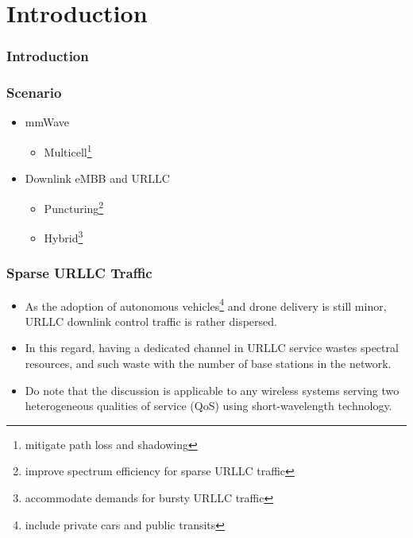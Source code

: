 \section{Introduction}
\begin{frame}
  \frametitle{Introduction}
\end{frame}

\begin{frame}
  \frametitle{Scenario}
  \begin{itemize}
    \item mmWave
      \begin{itemize}
        \item Multicell\footnote{mitigate path loss and shadowing}
      \end{itemize}
    \item Downlink eMBB and URLLC
      \begin{itemize}
        \item Puncturing\footnote{improve spectrum efficiency for sparse URLLC traffic}
        \item Hybrid\footnote{accommodate demands for bursty URLLC traffic}
      \end{itemize}
  \end{itemize}
\end{frame}

\begin{frame}
  \frametitle{Sparse URLLC Traffic}
  \begin{itemize}
    \item As the adoption of autonomous vehicles\footnote{include private cars and public transits} and drone delivery is still minor, URLLC downlink control traffic is rather dispersed.
    \item In this regard, having a dedicated channel in URLLC service wastes spectral resources, and such waste  with the number of base stations in the network.
  \end{itemize}
\end{frame}

\begin{frame}
  \begin{itemize}
    \item Do note that the discussion is applicable to any wireless systems serving two heterogeneous qualities of service (QoS) using short-wavelength technology.
  \end{itemize}
\end{frame}

